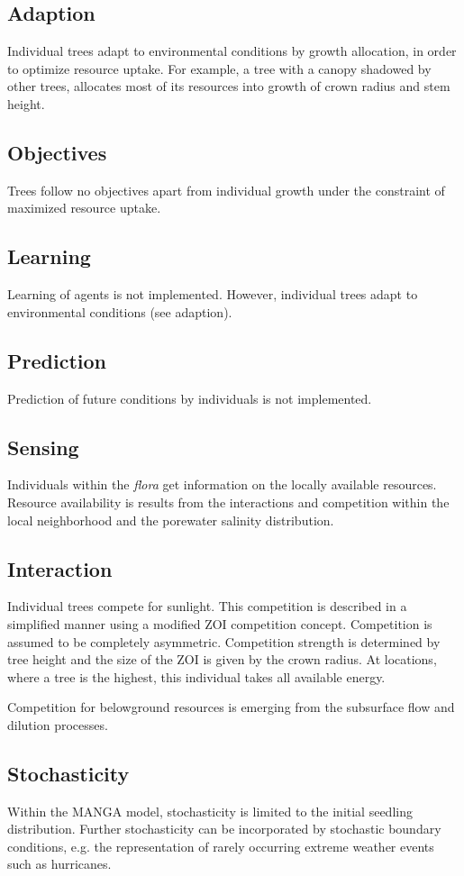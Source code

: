 \documentclass[manusscript, 12p, authoryear]{elsarticle}
\begin{document}
\subsection{Adaption}
Individual trees adapt to environmental conditions by growth allocation, in order to optimize resource uptake.
For example, a tree with a canopy shadowed by other trees, allocates most of its resources into growth of crown radius and stem height.
\subsection{Objectives}
Trees follow no objectives apart from individual growth under the constraint of maximized resource uptake.
\subsection{Learning}
Learning of agents is not implemented.
However, individual trees adapt to environmental conditions (see adaption).
\subsection{Prediction}
Prediction of future conditions by individuals is not implemented.
\subsection{Sensing}
Individuals within the \textit{flora} get information on the locally available resources.
Resource availability is results from the interactions and competition within the local neighborhood and the porewater salinity distribution.
\subsection{Interaction}
Individual trees compete for sunlight.
This competition is described in a simplified manner using a modified ZOI competition concept. 
Competition is assumed to be completely asymmetric.
Competition strength is determined by tree height and the size of the ZOI is given by the crown radius.
At locations, where a tree is the highest, this individual takes all available energy.

Competition for belowground resources is emerging from the subsurface flow and dilution processes.
\subsection{Stochasticity}
Within the MANGA model, stochasticity is limited to the initial seedling distribution.
Further stochasticity can be incorporated by stochastic boundary conditions, e.g. the representation of rarely occurring extreme weather events such as hurricanes.
\end{document}
